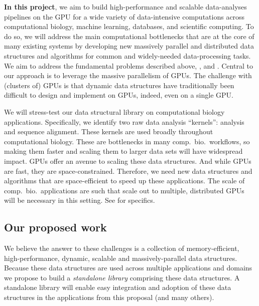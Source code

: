 %

\textbf{In this project}, we aim to build high-performance and scalable
data-analyses pipelines on the GPU for a wide variety of data-intensive
computations across computational biology, machine learning, databases, and
scientific computing.  To do so, we will address the main computational
bottlenecks that are at the core of many existing systems by developing new
massively parallel and distributed data structures and algorithms for common
and widely-needed data-processing tasks. We aim to address the fundamental
problems described above, , and .    
%
Central to our approach is to leverage the massive parallelism of GPUs. The
challenge with (clusters of) GPUs  is that dynamic data structures have
traditionally  been difficult to design and implement on GPUs, indeed, even on
a single GPU\@. 

We will stress-test our data structural library on computational biology
applications. Specifically, we identify two raw data analysis ``kernels'':
\Kmer analysis and sequence alignment. These kernels are used broadly
throughout computational biology. These are bottlenecks in many
comp.~bio.~workflows, so making them faster and scaling them to larger data
sets will have widespread impact. GPUs offer an avenue to scaling these data
structures. And while GPUs are fast, they are space-constrained.  Therefore,
we need new data structures and algorithms that are space-efficient to speed up
these applications. The scale of comp.~bio.~applications are such that scale
out to multiple, distributed GPUs will be necessary in this setting. See
 for specifics.  




\subsection{Our proposed work}

We believe the answer to these challenges is a collection of  memory-efficient,
high-performance, dynamic, scalable and massively-parallel data structures.
Because these data structures are used across multiple applications and domains
we propose to build a \emph{standalone library} comprising these data
structures. A standalone library will enable easy integration and adoption of
these data structures in the applications from this proposal (and many others).

